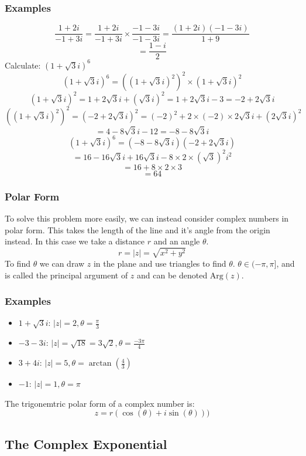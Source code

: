 \documentclass[12pt]{report}
\begin{document}
\begin{flushleft}
\subsubsection*{Examples}
\[\frac{1 + 2i}{-1 + 3i} = \frac{1 + 2i}{-1 + 3i} \times \frac{-1 - 3i}{-1 - 3i} = \frac{(1 + 2i)(-1 - 3i)}{1 + 9}\]
\[=\frac{1 - i}{2}\]
Calculate: \((1 + \sqrt{3}i)^6\)
\[(1 + \sqrt{3}i)^6 = ((1 + \sqrt{3}i)^2)^2 \times (1 + \sqrt{3}i)^2\]
\[(1 + \sqrt{3}i)^2 = 1 + 2\sqrt{3}i + (\sqrt{3}i)^2 = 1 + 2\sqrt{3}i - 3 = -2 + 2\sqrt{3}i\]
\[((1 + \sqrt{3}i)^2)^2 = (-2 + 2\sqrt{3}i)^2 = (-2)^2 + 2 \times (-2) \times 2\sqrt{3}i + (2\sqrt{3}i)^2\]
\[= 4 - 8\sqrt{3}i - 12 = -8 - 8 \sqrt{3}i\]
\[(1 + \sqrt{3}i)^6 = (-8 -8\sqrt{3}i)(-2 + 2\sqrt{3}i)\]
\[= 16 - 16\sqrt{3}i + 16\sqrt{3}i - 8 \times 2 \times (\sqrt{3})^2i^2\]
\[= 16 + 8 \times 2 \times 3\]
\[= 64\]

\subsubsection*{Polar Form}
To solve this problem more easily, we can instead consider complex numbers in polar form.
This takes the length of the line and it's angle from the origin instead. In this case we 
take a distance \(r\) and an angle \(\theta\).
\[r = |z| = \sqrt{x^2 + y^2}\]
To find \(\theta\) we can draw \(z\) in the plane and use triangles to find \(\theta\). \(\theta \in (-\pi, \pi]\), and
is called the principal argument of \(z\) and can be denoted \(\mathrm{Arg}(z)\).

\subsubsection*{Examples}
\begin{itemize}
    \item \(1 + \sqrt{3}i\): \(|z| = 2, \theta = \frac{\pi}{3}\)
    \item \(-3 - 3i\): \(|z| = \sqrt{18} = 3\sqrt{2}, \theta = \frac{-3\pi}{4}\)
    \item \(3 + 4i\): \(|z| = 5, \theta = \arctan(\frac{4}{3})\)
    \item \(-1\): \(|z| = 1, \theta = \pi\)
\end{itemize}

The trigonemtric polar form of a complex number is:
\[z = r(\cos(\theta) + i\sin(\theta)))\]

\subsection*{The Complex Exponential}


\end{flushleft}
\end{document}
